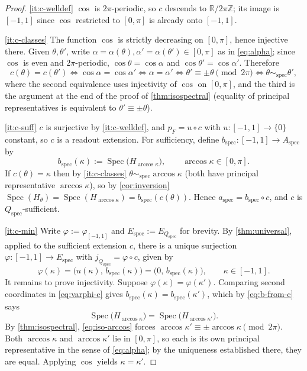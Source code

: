 \documentclass[11pt,reqno]{amsart}
\theoremstyle{plain}
\theoremstyle{definition}
\newcommand{\Rr}{\mathbb{R}}
\newcommand{\Zz}{\mathbb{Z}}
\newcommand{\Spec}{\operatorname{Spec}}
\begin{document}
\begin{proof}
\eqref{it:c-welldef} $\cos$ is $2\pi$-periodic, so $c$ descends to $\Rr/2\pi\Zz$; its image is
$[-1,1]$ since $\cos$ restricted to $[0,\pi]$ is already onto $[-1,1]$.

\eqref{it:c-classes} The function $\cos$ is strictly decreasing on $[0,\pi]$, hence injective
there. Given $\theta,\theta'$, write $\alpha=\alpha(\theta),\alpha'=\alpha(\theta')\in[0,\pi]$ as
in \eqref{eq:alpha}; since $\cos$ is even and $2\pi$-periodic, $\cos\theta=\cos\alpha$ and
$\cos\theta'=\cos\alpha'$. Therefore
\begin{equation*}
c(\theta)=c(\theta')
\iff \cos\alpha=\cos\alpha'
\iff \alpha=\alpha'
\iff \theta'\equiv\pm\theta \pmod{2\pi}
\iff \theta\sim_{\mathrm{spec}}\theta',
\end{equation*}
where the second equivalence uses injectivity of $\cos$ on $[0,\pi]$, and the third is the
argument at the end of the proof of \cref{thm:isospectral} (equality of principal representatives
is equivalent to $\theta'\equiv\pm\theta$).

\eqref{it:c-suff} $c$ is surjective by \eqref{it:c-welldef}, and $p_F=u\circ c$ with
$u\colon[-1,1]\to\{0\}$ constant, so $c$ is a readout extension. For sufficiency, define
$b_{\mathrm{spec}}\colon[-1,1]\to A_{\mathrm{spec}}$ by
\begin{equation}\label{eq:b-from-c}
b_{\mathrm{spec}}(\kappa):=\Spec\bigl(H_{\arccos\kappa}\bigr),
\qquad \arccos\kappa\in[0,\pi].
\end{equation}
If $c(\theta)=\kappa$ then by \eqref{it:c-classes} $\theta\sim_{\mathrm{spec}}\arccos\kappa$
(both have principal representative $\arccos\kappa$), so by \cref{cor:inversion}
$\Spec(H_\theta)=\Spec(H_{\arccos\kappa})=b_{\mathrm{spec}}(c(\theta))$. Hence
$a_{\mathrm{spec}}=b_{\mathrm{spec}}\circ c$, and $c$ is $Q_{\mathrm{spec}}$-sufficient.

\eqref{it:c-min} Write $\varphi:=\varphi_{[-1,1]}$ and $E_{\mathrm{spec}}
:=E_{Q_{\mathrm{spec}}}$ for brevity. By \cref{thm:universal}, applied to the sufficient
extension $c$, there is a unique surjection $\varphi\colon[-1,1]\to E_{\mathrm{spec}}$ with
$j_{Q_{\mathrm{spec}}}=\varphi\circ c$, given by
\begin{equation}\label{eq:varphi-c}
\varphi(\kappa)
=\bigl(u(\kappa),\,b_{\mathrm{spec}}(\kappa)\bigr)
=\bigl(0,\,b_{\mathrm{spec}}(\kappa)\bigr),
\qquad \kappa\in[-1,1].
\end{equation}
It remains to prove injectivity. Suppose $\varphi(\kappa)=\varphi(\kappa')$. Comparing second
coordinates in \eqref{eq:varphi-c} gives $b_{\mathrm{spec}}(\kappa)=b_{\mathrm{spec}}(\kappa')$,
which by \eqref{eq:b-from-c} says
\begin{equation}\label{eq:iso-arccos}
\Spec\bigl(H_{\arccos\kappa}\bigr)=\Spec\bigl(H_{\arccos\kappa'}\bigr).
\end{equation}
By \cref{thm:isospectral}, \eqref{eq:iso-arccos} forces
$\arccos\kappa'\equiv\pm\arccos\kappa \pmod{2\pi}$. Both $\arccos\kappa$ and $\arccos\kappa'$
lie in $[0,\pi]$, so each is its own principal representative in the sense of \eqref{eq:alpha};
by the uniqueness established there, they are equal. Applying $\cos$ yields $\kappa=\kappa'$.


\end{proof}
\end{document}
